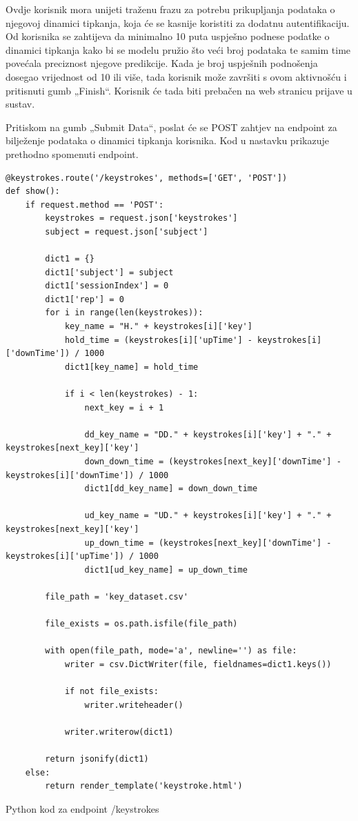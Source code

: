 \documentclass[]{foi}
\begin{document}
Ovdje korisnik mora unijeti traženu frazu za potrebu prikupljanja podataka o njegovoj dinamici tipkanja, koja će se kasnije koristiti za dodatnu autentifikaciju. Od korisnika se zahtijeva da minimalno 10 puta uspješno podnese podatke o dinamici tipkanja kako bi se modelu pružio što veći broj podataka te samim time povećala preciznost njegove predikcije. Kada je broj uspješnih podnošenja dosegao vrijednost od 10 ili više, tada korisnik može završiti s ovom aktivnošću i pritisnuti gumb „Finish“. Korisnik će tada biti prebačen na web stranicu prijave u sustav.

Pritiskom na gumb „Submit Data“, poslat će se POST zahtjev na endpoint za bilježenje podataka o dinamici tipkanja korisnika. Kod u nastavku prikazuje prethodno spomenuti endpoint.

\begin{longlisting}
\begin{verbatim}
@keystrokes.route('/keystrokes', methods=['GET', 'POST'])
def show():
    if request.method == 'POST':
        keystrokes = request.json['keystrokes']
        subject = request.json['subject']

        dict1 = {}
        dict1['subject'] = subject
        dict1['sessionIndex'] = 0
        dict1['rep'] = 0
        for i in range(len(keystrokes)):
            key_name = "H." + keystrokes[i]['key']
            hold_time = (keystrokes[i]['upTime'] - keystrokes[i]['downTime']) / 1000
            dict1[key_name] = hold_time

            if i < len(keystrokes) - 1:
                next_key = i + 1

                dd_key_name = "DD." + keystrokes[i]['key'] + "." + keystrokes[next_key]['key']
                down_down_time = (keystrokes[next_key]['downTime'] - keystrokes[i]['downTime']) / 1000
                dict1[dd_key_name] = down_down_time

                ud_key_name = "UD." + keystrokes[i]['key'] + "." + keystrokes[next_key]['key']
                up_down_time = (keystrokes[next_key]['downTime'] - keystrokes[i]['upTime']) / 1000
                dict1[ud_key_name] = up_down_time

        file_path = 'key_dataset.csv'

        file_exists = os.path.isfile(file_path)

        with open(file_path, mode='a', newline='') as file:
            writer = csv.DictWriter(file, fieldnames=dict1.keys())

            if not file_exists:
                writer.writeheader()

            writer.writerow(dict1)

        return jsonify(dict1)
    else:
        return render_template('keystroke.html')
\end{verbatim}
\caption{Python kod za endpoint /keystrokes}
\label{lst:python_tipkanje}
\end{longlisting}
\end{document}
